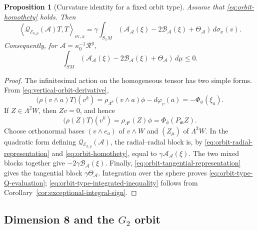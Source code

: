 \documentclass[reqno,11pt]{amsart}
\newtheorem{proposition}[theorem]{Proposition}
\theoremstyle{definition}
\newcommand{\SM}{SM}
\newcommand{\Rop}{\mathscr R}
\newcommand{\cA}{\mathcal A}
\newcommand{\cQ}{\mathcal Q}
\newcommand{\inner}[2]{\left\langle #1,#2\right\rangle}
\begin{document}
\begin{proposition}[Curvature identity for a fixed orbit type]
\label{prop:orbit-type-curvature}
Assume that \eqref{eq:orbit-homothety} holds.  Then
\begin{equation}\label{eq:orbit-type-Q-evaluation}
 \inner{\cQ_{\mathscr E_{k,p}}(\cA)T}{T}_{\mathrm{ev},x}
 =\gamma\int_{S_xM}
 \left(
  \mathscr A_{\cA}(\xi)-2\mathscr B_{\cA}(\xi)+\Theta_{\cA}
 \right)
 \,d\sigma_x(v).
\end{equation}
Consequently, for $\cA=\kappa_0^{-1}\Rop^g$,
\begin{equation}\label{eq:orbit-type-integrated-inequality}
 \int_{\SM}
 \left(
  \mathscr A_{\cA}(\xi)-2\mathscr B_{\cA}(\xi)+\Theta_{\cA}
 \right)
 \,d\mu\leq0.
\end{equation}
\end{proposition}

\begin{proof}
The infinitesimal action on the homogeneous tensor has two simple forms.
From \eqref{eq:vertical-orbit-derivative},
\begin{equation}\label{eq:orbit-radial-representation}
 \bigl(\rho(v\wedge a)T\bigr)(v^k)
 =\rho_{\Lambda^p}(v\wedge a)\phi-d\varphi_v(a)
 =-\Phi_\phi(\xi_a).
\end{equation}
If $Z\in\Lambda^2W$, then $Zv=0$, and hence
\begin{equation}\label{eq:orbit-tangential-representation}
 \bigl(\rho(Z)T\bigr)(v^k)
 =\rho_{\Lambda^p}(Z)\phi
 =\Phi_\phi(P_{\mathfrak m}Z).
\end{equation}
Choose orthonormal bases $(v\wedge e_a)$ of $v\wedge W$ and $(Z_\mu)$ of
$\Lambda^2W$.  In the quadratic form defining
$\cQ_{\mathscr E_{k,p}}(\cA)$, the radial--radial block is, by
\eqref{eq:orbit-radial-representation} and
\eqref{eq:orbit-homothety}, equal to
$\gamma\mathscr A_{\cA}(\xi)$.  The two mixed blocks together give
$-2\gamma\mathscr B_{\cA}(\xi)$.  Finally,
\eqref{eq:orbit-tangential-representation} gives the tangential block
$\gamma\Theta_{\cA}$.  Integration over the sphere proves
\eqref{eq:orbit-type-Q-evaluation};
\eqref{eq:orbit-type-integrated-inequality} follows from
Corollary~\ref{cor:exceptional-integral-sign}.
\end{proof}

\subsection{Dimension 8 and the \texorpdfstring{$G_2$}{G2} orbit}
\label{sec:dimension-eight}
\end{document}
